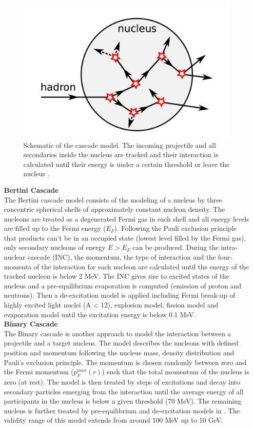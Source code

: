 \begin{figure}[htbp!]
  \centering
  \includegraphics[width=0.5\linewidth]{chap4/fig/CascadeModel.jpeg}
  \caption{Schematic of the cascade model. The incoming projectile and all secondaries inside the nucleus are tracked and their interaction is calculated until their energy is under a certain threshold or leave the nucleus \cite{Feege:2011dsa}.} \label{fig:cascademodel}
\end{figure}

\textbf{Bertini Cascade}\\

The Bertini cascade model \cite{Heikkinen2003} consists of the modeling of a nucleus by three concentric spherical shells of approximately constant nucleon density. The nucleons are treated as a degenerated Fermi gas in each shell and all energy levels are filled up to the Fermi energy ($E_F$). Following the Pauli exclusion principle that products can't be in an occupied state (lowest level filled by the Fermi gas), only secondary nucleons of energy $E > E_F$ can be produced. During the intra-nuclear cascade (INC), the momentum, the type of interaction and the four-momenta of the interaction for each nucleon are calculated until the energy of the tracked nucleon is below 2 MeV. The INC gives rise to excited states of the nucleus and a pre-equilibrium evaporation is computed (emission of proton and neutrons). Then a de-excitation model is applied including Fermi break-up of highly excited light nuclei (A < 12), explosion model, fission model and evaporation model until the excitation energy is below 0.1 MeV.\\

\textbf{Binary Cascade}\\

The Binary cascade \cite{Folger2004} is another approach to model the interaction between a projectile and a target nucleus. The model describes the nucleons with defined position and momentum following the nucleus mass, density distribution and Pauli's exclusion principle. The momentum is chosen randomly between zero and the Fermi momentum ($p_{F}^{max}(r)$) such that the total momentum of the nucleus is zero (at rest). The model is then treated by steps of excitations and decay into secondary particles emerging from the interaction until the average energy of all participants in the nucleus is below a given threshold (70 MeV). The remaining nucleus is further treated by pre-equilibrium and de-excitation models in \geant. The validity range of this model extends from around 100 MeV up to 10 GeV.

